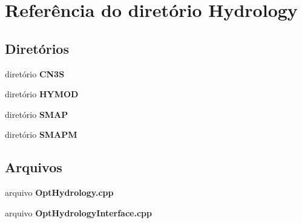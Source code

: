 \section{Referência do diretório Hydrology}
\label{dir_4fb97080c7521ac9cf5109228c90d1c8}
\subsection*{Diretórios}
\begin{DoxyCompactItemize}
\item 
diretório {\bf C\+N3S}
\item 
diretório {\bf H\+Y\+M\+OD}
\item 
diretório {\bf S\+M\+AP}
\item 
diretório {\bf S\+M\+A\+PM}
\end{DoxyCompactItemize}
\subsection*{Arquivos}
\begin{DoxyCompactItemize}
\item 
arquivo {\bf Opt\+Hydrology.\+cpp}
\item 
arquivo {\bf Opt\+Hydrology\+Interface.\+cpp}
\end{DoxyCompactItemize}
